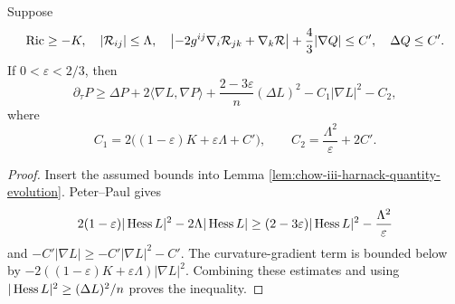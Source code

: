 \begin{corollary}
\label{cor:chow-iii-harnack-quantity-evolution-inequality}
Suppose
\[
 \Ric\geq-K,\quad |\mathcal R_{ij}|\leq\Lambda,
\quad
 \left|-2g^{ij}\nabla_i\mathcal R_{jk}+\nabla_k\mathcal R\right|
 +\frac43|\nabla Q|\leq C',\quad \Delta Q\leq C'.
\]
If \(0<\varepsilon<2/3\), then
\[
 \partial_\tau P\geq\Delta P+2\langle\nabla L,\nabla P\rangle
 +\frac{2-3\varepsilon}{n}(\Delta L)^2
 -C_1|\nabla L|^2-C_2,
\]
where
\[
 C_1=2\bigl((1-\varepsilon)K+\varepsilon\Lambda+C'\bigr),
 \qquad C_2=\frac{\Lambda^2}{\varepsilon}+2C'.
\]
\end{corollary}
\begin{proof}
Insert the assumed bounds into Lemma
\ref{lem:chow-iii-harnack-quantity-evolution}.  Peter--Paul gives
\[
 2(1-\varepsilon)|\operatorname{Hess} L|^2-2\Lambda|\operatorname{Hess} L|
 \geq(2-3\varepsilon)|\operatorname{Hess} L|^2-\frac{\Lambda^2}{\varepsilon}
\]
and
\(-C'|\nabla L|\geq-C'|\nabla L|^2-C'\).  The curvature-gradient term is
bounded below by
\(-2((1-\varepsilon)K+\varepsilon\Lambda)|\nabla L|^2\).
Combining these estimates and using
\(|\operatorname{Hess} L|^2\geq(\Delta L)^2/n\) proves the inequality.
\end{proof}
